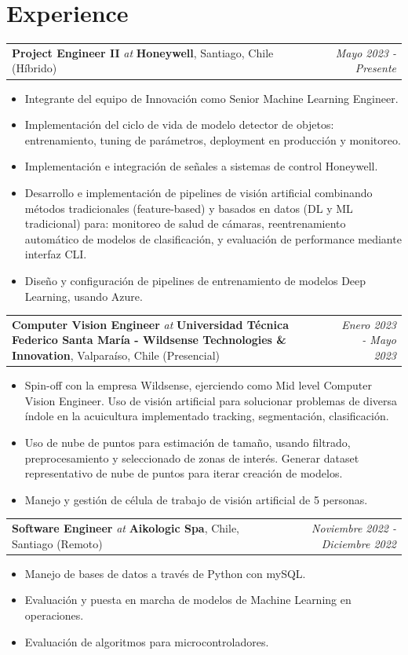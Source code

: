 \documentclass[11pt, letterpaper]{article}
\makeatletter
\newcommand{\experience}[5]{%
  \noindent
  \begin{tabularx}{\linewidth}{@{}X r@{}}
    \textbf{#1} \textit{at} \textbf{#2}, #3 & \textit{#4}
  \end{tabularx}
  \vspace{-10pt}
  #5
  \vspace{2pt}
}
\makeatother
\begin{document}
\section{Experience}
\experience
  {Project Engineer II}
  {Honeywell}
  {Santiago, Chile (Híbrido)}
  {Mayo 2023 - Presente}
  {
    \begin{itemize}
      \item Integrante del equipo de Innovación como Senior Machine Learning Engineer.
      \item Implementación del ciclo de vida de modelo detector de objetos: entrenamiento, tuning de parámetros, deployment en producción y monitoreo.
      \item Implementación e integración de señales a sistemas de control Honeywell.
      \item Desarrollo e implementación de pipelines de visión artificial combinando métodos tradicionales (feature-based) y basados en datos (DL y ML tradicional) para: monitoreo de salud de cámaras, reentrenamiento automático de modelos de clasificación, y evaluación de performance mediante interfaz CLI.
      \item Diseño y configuración de pipelines de entrenamiento de modelos Deep Learning, usando Azure.
    \end{itemize}
  }
\experience
  {Computer Vision Engineer}
  {Universidad Técnica Federico Santa María - Wildsense Technologies \& Innovation}
  {Valparaíso, Chile (Presencial)}
  {Enero 2023 - Mayo 2023}
  {
    \begin{itemize}
        \item Spin-off con la empresa Wildsense, ejerciendo como Mid level Computer Vision Engineer. Uso de visión artificial para solucionar problemas de diversa índole en la acuicultura implementado tracking, segmentación, clasificación.
        \item Uso de nube de puntos para estimación de tamaño, usando filtrado, preprocesamiento y seleccionado de zonas de interés. Generar dataset representativo de nube de puntos para iterar creación de modelos.
        \item Manejo y gestión de célula de trabajo de visión artificial de 5 personas.
    \end{itemize}
  }
\experience
  {Software Engineer}
  {Aikologic Spa}
  {Chile, Santiago (Remoto)}
  {Noviembre 2022 - Diciembre 2022}
  {
    \begin{itemize}
        \item Manejo de bases de datos a través de Python con mySQL.
        \item Evaluación y puesta en marcha de modelos de Machine Learning en operaciones. 
        \item Evaluación de algoritmos para microcontroladores.
    \end{itemize}
  }
\end{document}
